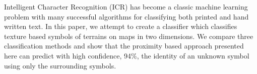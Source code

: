 Intelligent Character Recognition (ICR)
has become a classic machine learning problem with many successful algorithms for classifying
both printed and hand written text. In this paper, we attempt to create a classifier which
classifies texture based symbols of terrains on maps in two dimensions. We compare three
classification methods and show that the proximity based approach presented here can predict
with high confidence, 94\%, the identity of an unknown symbol using only the surrounding symbols.

